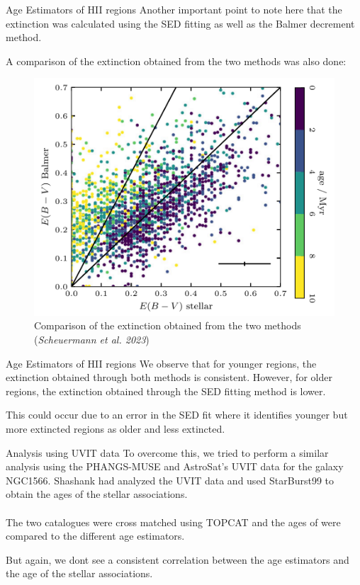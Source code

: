 \documentclass{beamer}
\begin{document}
\begin{frame}{Age Estimators of HII regions}
    Another important point to note here that the extinction was calculated using the SED fitting as well as the Balmer decrement method. 

    A comparison of the extinction obtained from the two methods was also done: 

    \begin{figure}[H]
        \centering
        \includegraphics[scale = 0.19]{image29.png}
        \caption{Comparison of the extinction obtained from the two methods (\textit{Scheuermann et al. 2023})}
        \label{fig:image29}
    \end{figure}
    
            
    
\end{frame}

\begin{frame}{Age Estimators of HII regions}
    We observe that for younger regions, the extinction obtained through both methods is consistent. However, for older regions, the extinction obtained through the SED fitting method is lower. 

    This could occur due to an error in the SED fit where it identifies younger but more extincted regions as older and less extincted. 

    
\end{frame}

\begin{frame}{Analysis using UVIT data}
    To overcome this, we tried to perform a similar analysis using the PHANGS-MUSE and AstroSat's UVIT data for the galaxy NGC1566. Shashank had analyzed the UVIT data and used StarBurst99 to obtain the ages of the stellar associations. 
    \\~\\
    The two catalogues were cross matched using TOPCAT and the ages of were compared to the different age estimators. 

    But again, we dont see a consistent correlation between the age estimators and the age of the stellar associations.
\end{frame}
\end{document}
